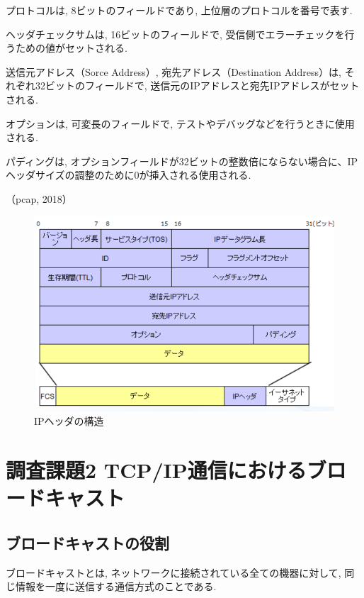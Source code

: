 \documentclass{ltjsarticle} %
\begin{document}
プロトコルは, 8ビットのフィールドであり, 上位層のプロトコルを番号で表す. 

ヘッダチェックサムは, 16ビットのフィールドで, 受信側でエラーチェックを行うための値がセットされる. 

送信元アドレス（Sorce Address）, 宛先アドレス（Destination Address）は, それぞれ32ビットのフィールドで, 
送信元のIPアドレスと宛先IPアドレスがセットされる. 

オプションは, 可変長のフィールドで, テストやデバッグなどを行うときに使用される. 

パディングは, オプションフィールドが32ビットの整数倍にならない場合に、IPヘッダサイズの調整のために0が挿入される使用される. 

（pcap, 2018）

\begin{figure}[H] %
  \centering
  \includegraphics[width=1.0\textwidth]{IP.png} %
  \caption{IPヘッダの構造} %
  \label{fig:IP} %
\end{figure}



\section{調査課題2 TCP/IP通信におけるブロードキャスト}

\subsection{ブロードキャストの役割}
ブロードキャストとは, ネットワークに接続されている全ての機器に対して, 同じ情報を一度に送信する通信方式のことである. 
\end{document}

